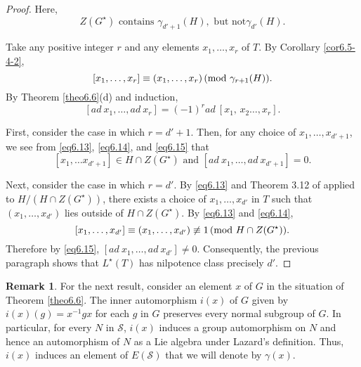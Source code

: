 \documentclass[mathscr]{amsart}
\theoremstyle{theorem}
\theoremstyle{definition}
\newtheorem{remark}[theorem]{Remark}
\numberwithin{equation}{section}
\newcommand{\smod}[1]{\hspace*{-.1cm}\pmod{#1}}
\def\S{\mathcal{S}}
\begin{document}
\begin{proof}
Here,
\begin{equation}\label{eq6.13}
Z(G^\star)\text{ contains }\gamma_{d'+1}(H),\text{ but not
}\gamma_{d'}(H).
\end{equation}

Take any positive integer $r$ and any elements $x_1,\dots,x_r$ of
$T$. By Corollary \ref{cor6.5-4-2},
\begin{equation}\label{eq6.14}
[x_1,\dots,x_r]\equiv(x_1,\dots,x_r)\smod{\gamma_{r+1}(H)}.
\end{equation}
By Theorem \ref{theo6.6}(d) and induction,
\begin{equation}\label{eq6.15}
[ad\ x_1,\dots,ad\ x_r]=(-1)^rad\ [x_1,\,x_2\dots,x_r].
\end{equation}

First, consider the case in which $r=d'+1$. Then, for any choice of
$x_1,\dots,x_{d'+1}$, we see from \eqref{eq6.13}, \eqref{eq6.14},
and \eqref{eq6.15} that
$$[x_1,\dots x_{d'+1}]\in H\cap Z(G^\star)\text{ and }[ad\ x_1,\dots,ad\ x_{d'+1}]=0.$$

Next, consider the case in which $r=d'$. By \eqref{eq6.13} and
Theorem 3.12 of \cite{Kh} applied to $H/(H\cap Z(G^\star))$, there
exists a choice of $x_1,\dots,x_{d'}$ in $T$ such that
$(x_1,\dots,x_{d'})$ lies outside of $H\cap Z(G^\star)$. By
\eqref{eq6.13} and \eqref{eq6.14},
$$[x_1,\dots,x_{d'}]\equiv(x_1,\dots,x_{d'})\not\equiv1\smod{H\cap Z(G^\star)}.$$
Therefore by \eqref{eq6.15}, $[ad\ x_1,\dots,ad\ x_{d'}]\neq0$.
Consequently, the previous paragraph shows that $L^\star(T)$ has
nilpotence class precisely $d'.$
\end{proof}

\begin{remark}\label{rem6.9}
For the next result, consider an element $x$ of $G$ in the situation
of Theorem \ref{theo6.6}. The inner automorphism $i(x)$ of $G$ given
by $i(x)(g)=x^{-1}gx$ for each $g$ in $G$ preserves every normal
subgroup of $G$. In particular, for every $N$ in $\S$, $i(x)$
induces a group automorphism on $N$ and hence an automorphism  of
$N$ as a Lie algebra under Lazard's definition. Thus, $i(x)$ induces
an element of $E(\S)$ that we will denote by $\gamma(x).$
\end{remark}

\end{document}
